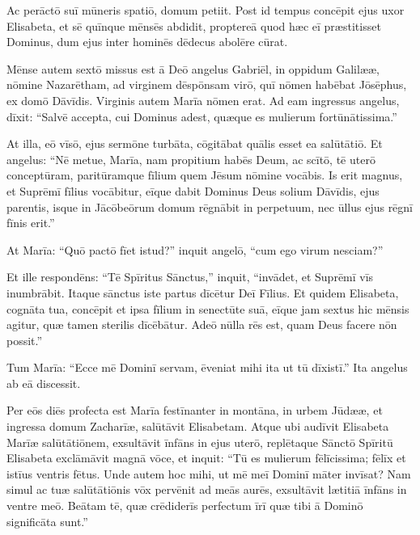 \Versus Ac perāctō suī mūneris spatiō, domum petiit.
\Versus Post id tempus concēpit ejus uxor Elisabeta, et sē quīnque mēnsēs abdidit,
\Versus proptereā quod hæc eī præstitisset Dominus, dum ejus inter hominēs dēdecus abolēre cūrat.

\Versus Mēnse autem sextō missus est ā Deō angelus Gabriēl, in oppidum Galilææ, nōmine Nazarētham,
\Versus ad virginem dēspōnsam virō, quī nōmen habēbat Jōsēphus, ex domō Dāvīdis. Virginis autem Marīa nōmen erat.
\Versus Ad eam ingressus angelus, dīxit: ``Salvē accepta, cui Dominus adest, quæque es mulierum fortūnātissima.''

\Versus At illa, eō vīsō, ejus sermōne turbāta, cōgitābat quālis esset ea salūtātiō.
\Versus Et angelus: ``Nē metue, Marīa, nam propitium habēs Deum,
\Versus ac scītō, tē uterō conceptūram, paritūramque fīlium quem Jēsum nōmine vocābis.
\Versus Is erit magnus, et Suprēmī fīlius vocābitur, eīque dabit Dominus Deus solium Dāvīdis, ejus parentis,
\Versus isque in Jācōbeōrum domum rēgnābit in perpetuum, nec ūllus ejus rēgnī fīnis erit.''

\Versus At Marīa: ``Quō pactō fīet istud?'' inquit angelō, ``cum ego virum nesciam?''

\Versus Et ille respondēns: ``Tē Spīritus Sānctus,'' inquit, ``invādet, et Suprēmī vīs inum\-brābit. Itaque sānctus iste partus dīcētur Deī Fīlius.
\Versus Et quidem Elisabeta, cognāta tua, concēpit et ipsa fīlium in senectūte suā, eīque jam sextus hic mēnsis agitur, quæ tamen sterilis dīcēbātur.
\Versus Adeō nūlla rēs est, quam Deus facere nōn possit.''

\Versus Tum Marīa: ``Ecce mē Dominī servam, ēveniat mihi ita ut tū dīxistī.'' Ita angelus ab eā discessit.

\Versus Per eōs diēs profecta est Marīa festīnanter in montāna, in urbem Jūdææ,
\Versus et ingressa domum Zacharīæ, salūtāvit Elisabetam.
\Versus Atque ubi audīvit Elisabeta Marīæ salūtātiōnem, exsultāvit īnfāns in ejus uterō, replētaque Sānctō Spīritū Elisabeta
\Versus exclā\-māvit magnā vōce, et inquit: ``Tū es mulierum fēlīcissima; fēlīx et istīus ventris fētus.
\Versus Unde autem hoc mihi, ut mē meī Dominī māter invīsat?
\Versus Nam simul ac tuæ salūtā\-tiōnis vōx pervēnit ad meās aurēs, exsultāvit lætitiā īnfāns in ventre meō.
\Versus Beātam tē, quæ crēdiderīs perfectum īrī quæ tibi ā Dominō significāta sunt.''


